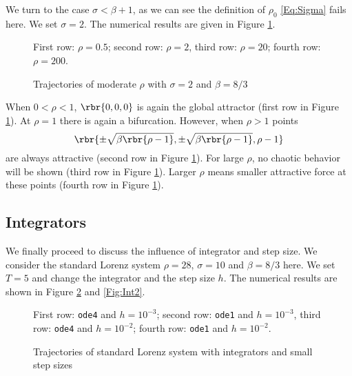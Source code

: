 \documentclass[english, nochinese]{pnote}
\begin{document}
We turn to the case $ \sigma < \beta + 1 $, as we can see the definition of $\rho_0$ \eqref{Eq:Sigma} fails here. We set $ \sigma = 2 $. The numerical results are given in Figure \ref{Fig:SmallRho}.

\begin{figure}[htbp]
{
\centering
\scalebox{0.5}{}
\scalebox{0.5}{}
\scalebox{0.5}{}
\scalebox{0.5}{}
\caption{Trajectories of moderate $\rho$ with $ \sigma = 2 $ and $ \beta = 8 / 3 $}
\label{Fig:SmallRho}
}
{
\footnotesize First row: $ \rho = 0.5 $; second row: $ \rho = 2 $, third row: $ \rho = 20 $; fourth row: $ \rho = 200 $.
}
\end{figure}

When $ 0 < \rho < 1 $, $ \rbr{ 0, 0, 0 } $ is again the global attractor (first row in Figure \ref{Fig:SmallRho}). At $ \rho = 1 $ there is again a bifurcation. However, when $ \rho > 1 $ points
\begin{equation}
\rbr{ \pm \sqrt{ \beta \rbr{ \rho - 1 } }, \pm \sqrt{ \beta \rbr{ \rho - 1 } }, \rho - 1 }
\end{equation}
are always attractive (second row in Figure \ref{Fig:SmallRho}). For large $\rho$, no chaotic behavior will be shown (third row in Figure \ref{Fig:SmallRho}). Larger $\rho$ means smaller attractive force at these points (fourth row in Figure \ref{Fig:SmallRho}).

\subsection{Integrators}

We finally proceed to discuss the influence of integrator and step size. We consider the standard Lorenz system $ \rho = 28 $, $ \sigma = 10 $ and $ \beta = 8 / 3 $ here. We set $ T = 5 $ and change the integrator and the step size $h$. The numerical results are shown in Figure \ref{Fig:Int1} and \ref{Fig:Int2}.

\begin{figure}[htbp]
{
\centering
\scalebox{0.5}{}
\scalebox{0.5}{}
\scalebox{0.5}{}
\scalebox{0.5}{}
\caption{Trajectories of standard Lorenz system with integrators and small step sizes}
\label{Fig:Int1}
}
{
\footnotesize First row: \texttt{ode4} and $ h = 10^{-3} $; second row: \texttt{ode1} and $ h = 10^{-3} $, third row: \texttt{ode4} and $ h = 10^{-2} $; fourth row: \texttt{ode1} and $ h = 10^{-2} $.
}
\end{figure}
\end{document}
